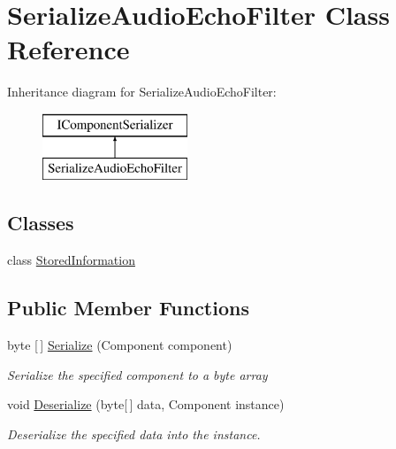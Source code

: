 \hypertarget{class_serialize_audio_echo_filter}{}\section{Serialize\+Audio\+Echo\+Filter Class Reference}
\label{class_serialize_audio_echo_filter}
Inheritance diagram for Serialize\+Audio\+Echo\+Filter\+:\begin{figure}[H]
\begin{center}
\leavevmode
\includegraphics[height=2.000000cm]{class_serialize_audio_echo_filter}
\end{center}
\end{figure}
\subsection*{Classes}
\begin{DoxyCompactItemize}
\item 
class \hyperlink{class_serialize_audio_echo_filter_1_1_stored_information}{Stored\+Information}
\end{DoxyCompactItemize}
\subsection*{Public Member Functions}
\begin{DoxyCompactItemize}
\item 
byte \mbox{[}$\,$\mbox{]} \hyperlink{class_serialize_audio_echo_filter_a05a44375abc89e383547960120fb55e6}{Serialize} (Component component)
\begin{DoxyCompactList}\small\item\em Serialize the specified component to a byte array \end{DoxyCompactList}\item 
void \hyperlink{class_serialize_audio_echo_filter_ad5beda12b5d39b678ce291ee1c13374c}{Deserialize} (byte\mbox{[}$\,$\mbox{]} data, Component instance)
\begin{DoxyCompactList}\small\item\em Deserialize the specified data into the instance. \end{DoxyCompactList}\end{DoxyCompactItemize}


